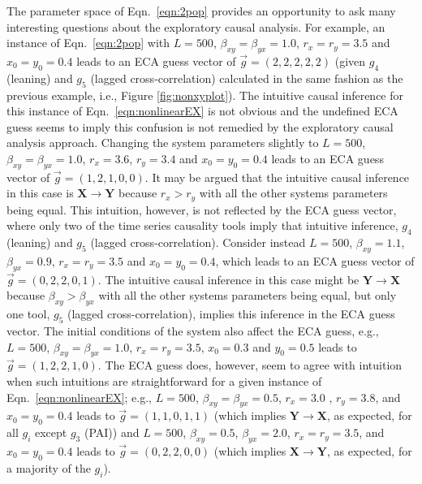 The parameter space of Eqn.\ \ref{eqn:2pop} provides an opportunity to ask many interesting questions about the exploratory causal analysis.  For example, an instance of Eqn.\ \ref{eqn:2pop} with $L=500$, $\beta_{xy} = \beta_{yx} = 1.0$, $r_x = r_y = 3.5$ and $x_0 = y_0 = 0.4$ leads to an ECA guess vector of $\vec{g}=(2,2,2,2,2)$ (given $g_4$ (leaning) and $g_5$ (lagged cross-correlation) calculated in the same fashion as the previous example, i.e., Figure \ref{fig:nonxyplot}).  The intuitive causal inference for this instance of Eqn.\ \ref{eqn:nonlinearEX} is not obvious and the undefined ECA guess seems to imply this confusion is not remedied by the exploratory causal analysis approach.  Changing the system parameters slightly to $L=500$, $\beta_{xy} = \beta_{yx} = 1.0$, $r_x = 3.6$, $r_y = 3.4$ and $x_0 = y_0 = 0.4$ leads to an ECA guess vector of $\vec{g}=(1,2,1,0,0)$.  It may be argued that the intuitive causal inference in this case is $\mathbf{X}\rightarrow\mathbf{Y}$ because $r_x>r_y$ with all the other systems parameters being equal.  This intuition, however, is not reflected by the ECA guess vector, where only two of the time series causality tools imply that intuitive inference, $g_4$ (leaning) and $g_5$ (lagged cross-correlation).  Consider instead $L=500$, $\beta_{xy} = 1.1$, $\beta_{yx} = 0.9$, $r_x = r_y = 3.5$ and $x_0 = y_0 = 0.4$, which leads to an ECA guess vector of $\vec{g}=(0,2,2,0,1)$.  The intuitive causal inference in this case might be $\mathbf{Y}\rightarrow\mathbf{X}$ because $\beta_{xy}>\beta_{yx}$ with all the other systems parameters being equal, but only one tool, $g_5$ (lagged cross-correlation), implies this inference in the ECA guess vector.  The initial conditions of the system also affect the ECA guess, e.g., $L=500$, $\beta_{xy} = \beta_{yx} = 1.0$, $r_x = r_y = 3.5$, $x_0 = 0.3$ and $y_0 = 0.5$ leads to $\vec{g}=(1,2,2,1,0)$.  The ECA guess does, however, seem to agree with intuition when such intuitions are straightforward for a given instance of Eqn.\ \ref{eqn:nonlinearEX}; e.g., $L=500$, $\beta_{xy} = \beta_{yx} = 0.5$, $r_x = 3.0$ , $r_y = 3.8$, and $x_0 = y_0 = 0.4$ leads to $\vec{g}=(1,1,0,1,1)$ (which implies $\mathbf{Y}\rightarrow\mathbf{X}$, as expected, for all $g_i$ except $g_3$ (PAI)) and $L=500$, $\beta_{xy} = 0.5$, $\beta_{yx} = 2.0$, $r_x = r_y = 3.5$, and $x_0 = y_0 = 0.4$ leads to $\vec{g}=(0,2,2,0,0)$ (which implies $\mathbf{X}\rightarrow\mathbf{Y}$, as expected, for a majority of the $g_i$).

